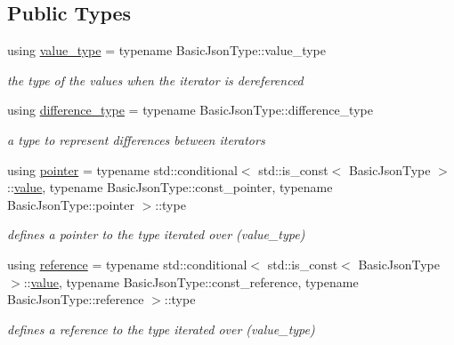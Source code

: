 \subsection*{Public Types}
\begin{DoxyCompactItemize}
\item 
\mbox{\label{classnlohmann_1_1detail_1_1iter__impl_ab35586a44f2222272c5346baa3013f67}} 
using \hyperlink{classnlohmann_1_1detail_1_1iter__impl_ab35586a44f2222272c5346baa3013f67}{value\+\_\+type} = typename Basic\+Json\+Type\+::value\+\_\+type
\begin{DoxyCompactList}\small\item\em the type of the values when the iterator is dereferenced \end{DoxyCompactList}\item 
\mbox{\label{classnlohmann_1_1detail_1_1iter__impl_a2f7ea9f7022850809c60fc3263775840}} 
using \hyperlink{classnlohmann_1_1detail_1_1iter__impl_a2f7ea9f7022850809c60fc3263775840}{difference\+\_\+type} = typename Basic\+Json\+Type\+::difference\+\_\+type
\begin{DoxyCompactList}\small\item\em a type to represent differences between iterators \end{DoxyCompactList}\item 
\mbox{\label{classnlohmann_1_1detail_1_1iter__impl_a69e52f890ce8c556fd68ce109e24b360}} 
using \hyperlink{classnlohmann_1_1detail_1_1iter__impl_a69e52f890ce8c556fd68ce109e24b360}{pointer} = typename std\+::conditional$<$ std\+::is\+\_\+const$<$ Basic\+Json\+Type $>$\+::\hyperlink{classnlohmann_1_1detail_1_1iter__impl_ab447c50354c6611fa2ae0100ac17845c}{value}, typename Basic\+Json\+Type\+::const\+\_\+pointer, typename Basic\+Json\+Type\+::pointer $>$\+::type
\begin{DoxyCompactList}\small\item\em defines a pointer to the type iterated over (value\+\_\+type) \end{DoxyCompactList}\item 
\mbox{\label{classnlohmann_1_1detail_1_1iter__impl_a5be8001be099c6b82310f4d387b953ce}} 
using \hyperlink{classnlohmann_1_1detail_1_1iter__impl_a5be8001be099c6b82310f4d387b953ce}{reference} = typename std\+::conditional$<$ std\+::is\+\_\+const$<$ Basic\+Json\+Type $>$\+::\hyperlink{classnlohmann_1_1detail_1_1iter__impl_ab447c50354c6611fa2ae0100ac17845c}{value}, typename Basic\+Json\+Type\+::const\+\_\+reference, typename Basic\+Json\+Type\+::reference $>$\+::type
\begin{DoxyCompactList}\small\item\em defines a reference to the type iterated over (value\+\_\+type) \end{DoxyCompactList}\end{DoxyCompactItemize}

